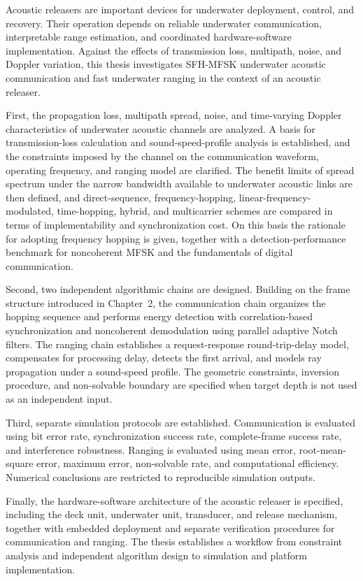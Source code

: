 \begin{eabstract}
  Acoustic releasers are important devices for underwater deployment, control, and recovery. Their operation depends on reliable underwater communication, interpretable range estimation, and coordinated hardware-software implementation. Against the effects of transmission loss, multipath, noise, and Doppler variation, this thesis investigates SFH-MFSK underwater acoustic communication and fast underwater ranging in the context of an acoustic releaser.

  First, the propagation loss, multipath spread, noise, and time-varying Doppler characteristics of underwater acoustic channels are analyzed. A basis for transmission-loss calculation and sound-speed-profile analysis is established, and the constraints imposed by the channel on the communication waveform, operating frequency, and ranging model are clarified. The benefit limits of spread spectrum under the narrow bandwidth available to underwater acoustic links are then defined, and direct-sequence, frequency-hopping, linear-frequency-modulated, time-hopping, hybrid, and multicarrier schemes are compared in terms of implementability and synchronization cost. On this basis the rationale for adopting frequency hopping is given, together with a detection-performance benchmark for noncoherent MFSK and the fundamentals of digital communication.

  Second, two independent algorithmic chains are designed. Building on the frame structure introduced in Chapter~2, the communication chain organizes the hopping sequence and performs energy detection with correlation-based synchronization and noncoherent demodulation using parallel adaptive Notch filters. The ranging chain establishes a request-response round-trip-delay model, compensates for processing delay, detects the first arrival, and models ray propagation under a sound-speed profile. The geometric constraints, inversion procedure, and non-solvable boundary are specified when target depth is not used as an independent input.

  Third, separate simulation protocols are established. Communication is evaluated using bit error rate, synchronization success rate, complete-frame success rate, and interference robustness. Ranging is evaluated using mean error, root-mean-square error, maximum error, non-solvable rate, and computational efficiency. Numerical conclusions are restricted to reproducible simulation outputs.

  Finally, the hardware-software architecture of the acoustic releaser is specified, including the deck unit, underwater unit, transducer, and release mechanism, together with embedded deployment and separate verification procedures for communication and ranging. The thesis establishes a workflow from constraint analysis and independent algorithm design to simulation and platform implementation.
\end{eabstract}
